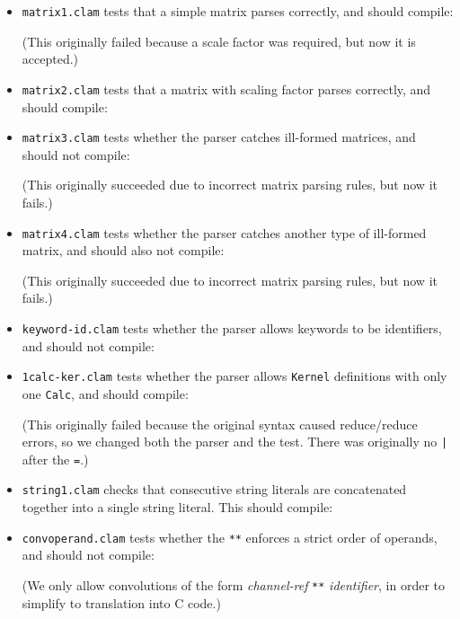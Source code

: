 \begin{itemize}

\item \texttt{matrix1.clam} tests that a simple matrix parses correctly, and should compile:

(This originally failed because a scale factor was required, but now it is accepted.)

\item \texttt{matrix2.clam} tests that a matrix with scaling factor parses correctly, and should compile:


\item \texttt{matrix3.clam} tests whether the parser catches ill-formed matrices, and should not compile:

(This originally succeeded due to incorrect matrix parsing rules, but now it fails.)

\item \texttt{matrix4.clam} tests whether the parser catches another type of ill-formed matrix, and should also not compile:

(This originally succeeded due to incorrect matrix parsing rules, but now it fails.)

\item \texttt{keyword-id.clam} tests whether the parser allows keywords to be identifiers, and should not compile:


\item \texttt{1calc-ker.clam} tests whether the parser allows \texttt{Kernel} definitions with only one \texttt{Calc}, and should compile:

(This originally failed because the original syntax caused reduce/reduce errors, so we changed both the parser and the test.
There was originally no \texttt{|} after the \texttt{=}.)

\item\texttt{string1.clam} checks that consecutive string literals are
  concatenated together into a single string literal. This should compile:


\item \texttt{convoperand.clam} tests whether the \texttt{**} enforces a strict order of operands, and should not compile:

(We only allow convolutions of the form \emph{channel-ref} \texttt{**} \emph{identifier}, in order to simplify
to translation into C code.)


\end{itemize}
